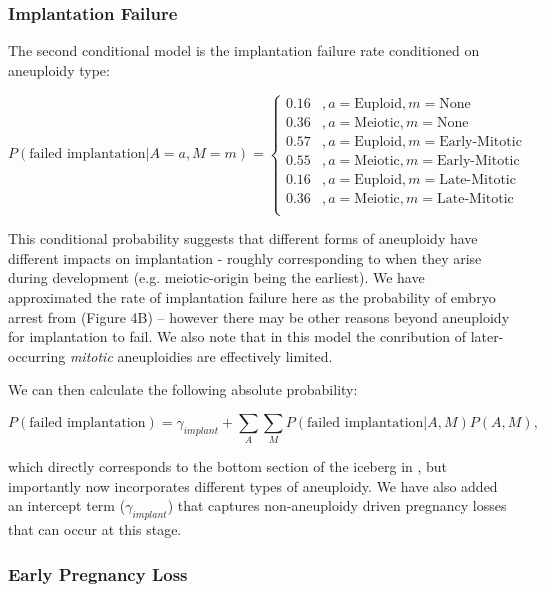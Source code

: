 \documentclass{article}
\begin{document}
\subsubsection*{Implantation Failure}

The second conditional model is the implantation failure rate conditioned on aneuploidy type: 

\begin{equation}
P(\text{failed implantation} | A=a, M=m) = \begin{cases}
0.16 &, a = \text{Euploid}, m = \text{None}\\
0.36 &, a = \text{Meiotic}, m = \text{None}\\
0.57 &, a = \text{Euploid}, m = \text{Early-Mitotic}\\
0.55 &, a = \text{Meiotic}, m = \text{Early-Mitotic}\\
0.16 &, a = \text{Euploid}, m = \text{Late-Mitotic}\\
0.36 &, a = \text{Meiotic}, m = \text{Late-Mitotic}\\
\end{cases}
\end{equation}

This conditional probability suggests that different forms of aneuploidy have different impacts on implantation - roughly corresponding to when they arise during development (e.g. meiotic-origin being the earliest).  We have approximated the rate of implantation failure here as the probability of embryo arrest from \citep{McCoy2023-dg} (Figure 4B) -- however there may be other reasons beyond aneuploidy for implantation to fail. We also note that in this model the conribution of later-occurring \textit{mitotic} aneuploidies are effectively limited.   

We can then calculate the following absolute probability:

\begin{equation}
P(\text{failed implantation}) = \gamma_{implant} + \sum_{A}\sum_{M} P(\text{failed implantation} | A, M) P(A, M) ,
\end{equation}

which directly corresponds to the bottom section of the iceberg in \citep{Macklon2002-zn}, but importantly now incorporates different types of aneuploidy. We have also added an intercept term ($\gamma_{implant}$) that captures non-aneuploidy driven pregnancy losses that can occur at this stage.   

\subsubsection*{Early Pregnancy Loss}
\end{document}
